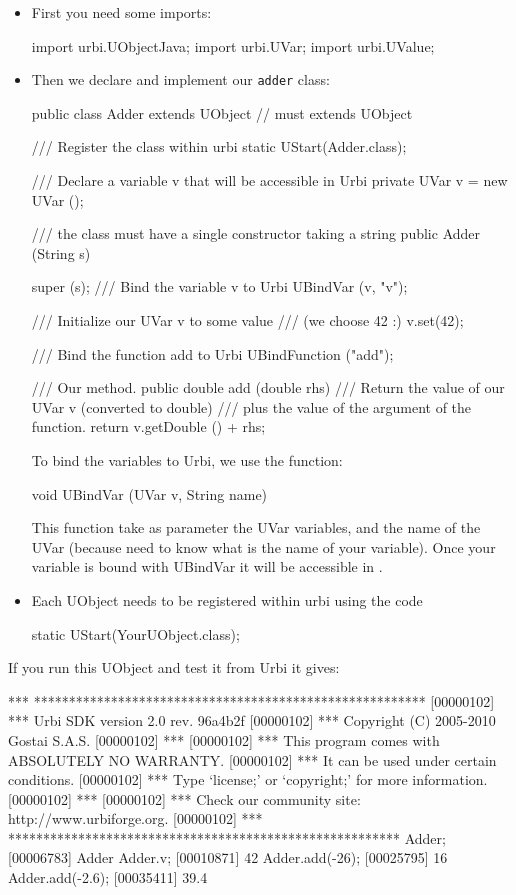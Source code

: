 \begin{itemize}
\item First you need some imports:

\begin{java}
import urbi.UObjectJava;
import urbi.UVar;
import urbi.UValue;
\end{java}

\item Then we declare and implement our \lstinline{adder} class:
\begin{java}
public class Adder extends UObject // must extends UObject
{
  /// Register the class within urbi
  static { UStart(Adder.class); }

  /// Declare a variable v that will be accessible in Urbi
  private UVar v = new UVar ();

  /// the class must have a single constructor taking a string
  public Adder (String s)
  {
    super (s);
    /// Bind the variable v to Urbi
    UBindVar (v, "v");

    /// Initialize our UVar v to some value
    /// (we choose 42 :)
    v.set(42);

    /// Bind the function add to Urbi
    UBindFunction ("add");
  }

  /// Our method.
  public double add (double rhs)
  {
    /// Return the value of our UVar v (converted to double)
    /// plus the value of the argument of the function.
    return v.getDouble () + rhs;
  }
}
\end{java}

To bind the variables to Urbi, we use the function:
\begin{cxx}
void UBindVar (UVar v, String name)
\end{cxx}

This function take as parameter the UVar variables, and the name of the
UVar (because \urbi need to know what is the name of your variable).
Once your variable is bound with UBindVar it will be accessible in \urbi.

\item Each UObject needs to be registered within urbi using the code
\begin{cxx}
static { UStart(YourUObject.class); }
\end{cxx}
\end{itemize}

If you run this UObject and test it from Urbi it gives:

\begin{urbiunchecked}
[00000102] *** ********************************************************
[00000102] *** Urbi SDK version 2.0 rev. 96a4b2f
[00000102] *** Copyright (C) 2005-2010 Gostai S.A.S.
[00000102] ***
[00000102] *** This program comes with ABSOLUTELY NO WARRANTY.
[00000102] *** It can be used under certain conditions.
[00000102] *** Type `license;' or `copyright;' for more information.
[00000102] ***
[00000102] *** Check our community site: http://www.urbiforge.org.
[00000102] *** ********************************************************
Adder;
[00006783] Adder
Adder.v;
[00010871] 42
Adder.add(-26);
[00025795] 16
Adder.add(-2.6);
[00035411] 39.4
\end{urbiunchecked}

